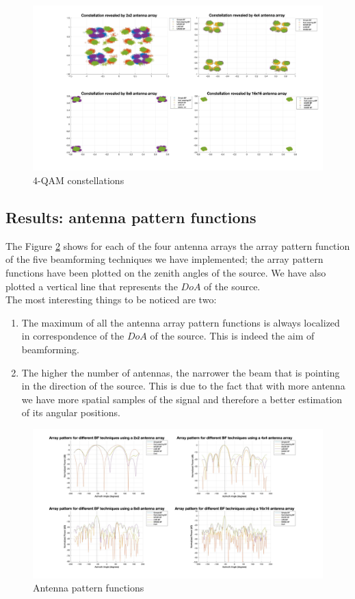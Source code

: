\begin{figure}[ht]
    \includegraphics[width=\linewidth]{Constellations.jpg}
    \caption{4-QAM constellations}
    \label{fig:Constellations}
\end{figure}

\subsection{Results: antenna pattern functions}

The Figure \ref{fig:Array_pattern} shows for each of the four antenna arrays the array pattern function of the five
beamforming techniques we have implemented; the array pattern functions have been plotted on the zenith angles of the source.
We have also plotted a vertical line that represents the $DoA$ of the source.\\
The most interesting things to be noticed are two:

\begin{enumerate}
    \item The maximum of all the antenna array pattern functions is always localized in correspondence of the $DoA$ of the source.
            This is indeed the aim of beamforming.
    \item The higher the number of antennas, the narrower the beam that is pointing in the direction of the source. This is due 
            to the fact that with more antenna we have more spatial samples of the signal and therefore a better estimation of 
            its angular positions. 
\end{enumerate}

\begin{figure}[ht]
    \includegraphics[width=\linewidth]{Array_pattern.jpg}
    \caption{Antenna pattern functions}
    \label{fig:Array_pattern}
\end{figure}

